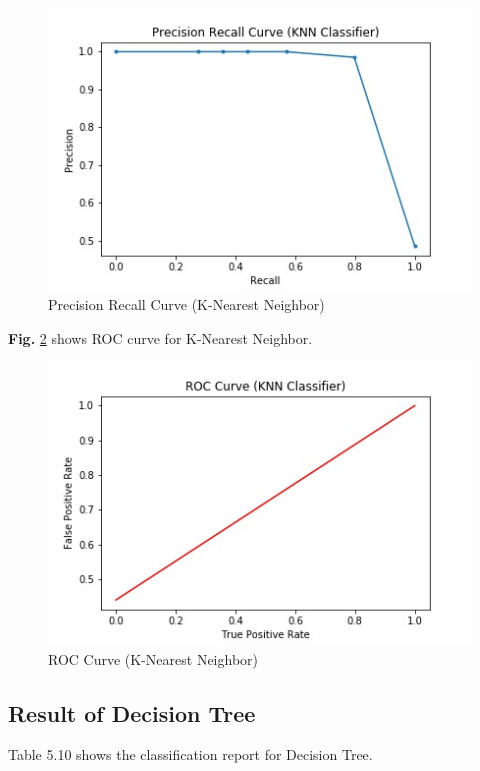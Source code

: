 \begin{figure}[h!]
    \centering
    \includegraphics[scale=0.58]{Figures/PRKNN.jpg}
    \caption{Precision Recall Curve (K-Nearest Neighbor)}
    \label{fig:prknn}
\end{figure}

\noindent
\textbf{Fig.} \ref{fig:rocknn} shows ROC curve for K-Nearest Neighbor.

\begin{figure}[h!]
    \centering
    \includegraphics[scale=0.58]{Figures/ROCKNN.jpg}
    \caption{ROC Curve (K-Nearest Neighbor)}
    \label{fig:rocknn}
\end{figure}

\subsection{Result of Decision Tree}
Table 5.10 shows the classification report for Decision Tree.

